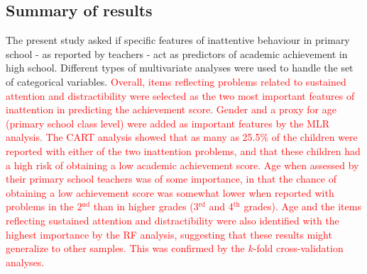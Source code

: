 \documentclass[10pt,letterpaper]{article}
\begin{document}
{{\subsection*{Summary of results}
The present study asked if specific features of inattentive behaviour in primary school - as reported by teachers - act as predictors of academic achievement in high school. Different types of multivariate analyses were used to handle the set of categorical variables.  \textcolor{red}{Overall, items reflecting problems related to sustained attention and distractibility were selected as the two most important features of inattention in predicting the achievement score. Gender and a proxy for age (primary school class level) were added as important features by the MLR analysis. The CART analysis showed that as many as 25.5\% of the children were reported with either of the two inattention problems, and that these children had a high risk of obtaining a low academic achievement score. Age  when assessed by their primary school teachers was of some importance, in that the chance of obtaining a low achievement score was somewhat lower when reported with problems in the  2$^{\text{nd}}$ than in higher grades (3$^{\text{rd}}$ and 4$^{\text{th}}$  grades). Age and the items reflecting sustained attention and distractibility were also identified with the highest importance by the RF analysis, suggesting that these results might generalize to other samples. 
This was confirmed by the $k$-fold cross-validation analyses.}\\

% 

}}
\end{document}
